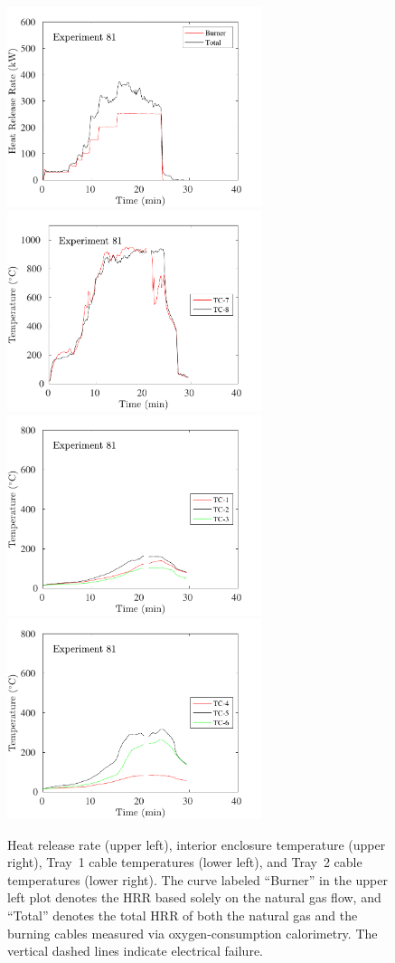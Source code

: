 \begin{figure}[H]
\includegraphics[height=2.30in]{../SCRIPT_FIGURES/Test_81_HRR} \hfill
\includegraphics[height=2.30in]{../SCRIPT_FIGURES/Test_81_TC_7-8} \\
\includegraphics[height=2.30in]{../SCRIPT_FIGURES/Test_81_TC_1-3} \hfill
\includegraphics[height=2.30in]{../SCRIPT_FIGURES/Test_81_TC_4-6}
\caption[HRR and temperatures of Exp.~81]{Heat release rate (upper left), interior enclosure temperature (upper right), Tray~1 cable temperatures (lower left), and Tray~2 cable temperatures (lower right). The curve labeled ``Burner'' in the upper left plot denotes the HRR based solely on the natural gas flow, and ``Total'' denotes the total HRR of both the natural gas and the burning cables measured via oxygen-consumption calorimetry. The vertical dashed lines indicate electrical failure.}
\label{fig:Test_81}
\end{figure}

